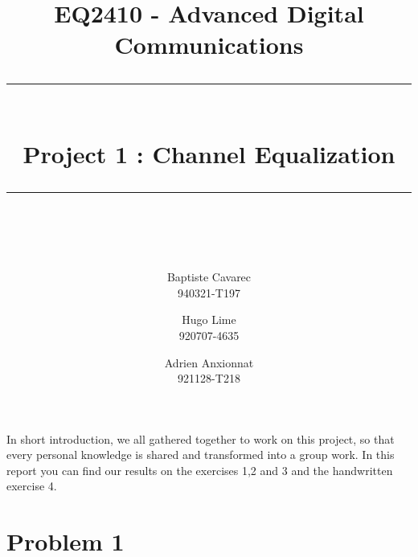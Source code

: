\documentclass[a4paper]{article}
\begin{document}
\newcommand{\HRule}{\rule{\linewidth}{0.5mm}} 
\title{{\LARGE EQ2410 - Advanced Digital Communications} \\[0.5cm] \HRule \\[0.4cm]{Project 1 : Channel Equalization}\\[0.2cm] \HRule \\[0.5cm] }
\author{Baptiste Cavarec \\ 940321-T197 \and Hugo Lime\\  920707-4635 \and Adrien Anxionnat\\ 921128-T218}

\maketitle
\abstract
In short introduction, we all gathered together to work on this project, so that every personal knowledge is shared and transformed into a group work. In this report you can find our results on the exercises 1,2 and 3 and the handwritten exercise 4.


\section{Problem 1}
\end{document}
